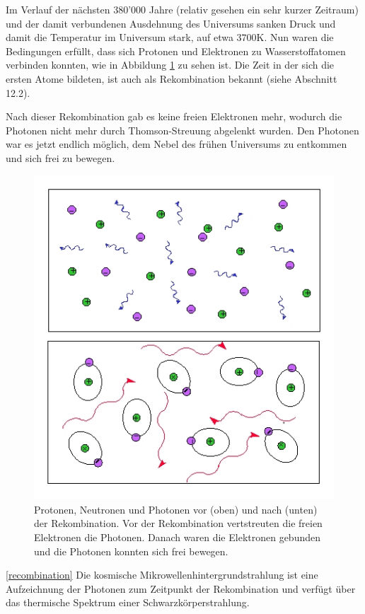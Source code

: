 Im Verlauf der nächsten 380'000 Jahre (relativ gesehen ein sehr kurzer 
Zeitraum) und der damit verbundenen Ausdehnung des Universums sanken Druck und 
damit die Temperatur im Universum stark, auf etwa $3700 \text{K}$.
Nun waren die Bedingungen erfüllt, dass sich Protonen und Elektronen zu 
Wasserstoffatomen verbinden konnten, wie in Abbildung \ref{fig:recombination} 
zu sehen ist. Die Zeit in der sich die ersten Atome bildeten, ist auch als 
Rekombination bekannt (siehe Abschnitt 12.2).

Nach dieser Rekombination gab es keine freien Elektronen mehr, wodurch die 
Photonen nicht mehr durch Thomson-Streuung abgelenkt wurden.
Den Photonen war es jetzt endlich möglich, dem Nebel des frühen Universums zu 
entkommen und sich frei zu bewegen.
\begin{figure}
	\centering
	\includegraphics[scale=0.5]{cmb/images/recombination.jpg}
	\caption{Protonen, Neutronen und Photonen vor (oben) und nach (unten) der Rekombination. Vor der 
		Rekombination vertstreuten die freien Elektronen die Photonen. Danach waren die Elektronen gebunden
		und die Photonen konnten sich frei bewegen.}
	\label{fig:recombination}
\end{figure}
\ref{recombination}
Die kosmische Mikrowellenhintergrundstrahlung ist eine Aufzeichnung der Photonen zum 
Zeitpunkt der Rekombination und verfügt über das thermische Spektrum einer Schwarzkörperstrahlung.

